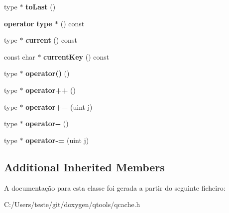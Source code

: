 \begin{DoxyCompactItemize}
\item 
\hypertarget{class_q_cache_iterator_ae427337160afaa9645615a818663af55}{type $\ast$ {\bfseries to\-Last} ()}\label{class_q_cache_iterator_ae427337160afaa9645615a818663af55}

\item 
\hypertarget{class_q_cache_iterator_a2e144510e7eb044f9d96660f6590a589}{{\bfseries operator type $\ast$} () const }\label{class_q_cache_iterator_a2e144510e7eb044f9d96660f6590a589}

\item 
\hypertarget{class_q_cache_iterator_ac22b90cda8a81fe45ae121578fcf9726}{type $\ast$ {\bfseries current} () const }\label{class_q_cache_iterator_ac22b90cda8a81fe45ae121578fcf9726}

\item 
\hypertarget{class_q_cache_iterator_a61c51c740822498cafca355946ba7cbb}{const char $\ast$ {\bfseries current\-Key} () const }\label{class_q_cache_iterator_a61c51c740822498cafca355946ba7cbb}

\item 
\hypertarget{class_q_cache_iterator_a53bb20f7dd4f90cc047f999b7dec5fe0}{type $\ast$ {\bfseries operator()} ()}\label{class_q_cache_iterator_a53bb20f7dd4f90cc047f999b7dec5fe0}

\item 
\hypertarget{class_q_cache_iterator_a60e0a5b2a616525ebaec6c235b066c3e}{type $\ast$ {\bfseries operator++} ()}\label{class_q_cache_iterator_a60e0a5b2a616525ebaec6c235b066c3e}

\item 
\hypertarget{class_q_cache_iterator_a689beef631dff5b294c16f1246e6c230}{type $\ast$ {\bfseries operator+=} (uint j)}\label{class_q_cache_iterator_a689beef631dff5b294c16f1246e6c230}

\item 
\hypertarget{class_q_cache_iterator_a27b7f0088525ef58cf50fd09f9fdda1e}{type $\ast$ {\bfseries operator-\/-\/} ()}\label{class_q_cache_iterator_a27b7f0088525ef58cf50fd09f9fdda1e}

\item 
\hypertarget{class_q_cache_iterator_a2b73339c97d5e4813c6919bfb3b1f8d1}{type $\ast$ {\bfseries operator-\/=} (uint j)}\label{class_q_cache_iterator_a2b73339c97d5e4813c6919bfb3b1f8d1}

\end{DoxyCompactItemize}
\subsection*{Additional Inherited Members}


A documentação para esta classe foi gerada a partir do seguinte ficheiro\-:\begin{DoxyCompactItemize}
\item 
C\-:/\-Users/teste/git/doxygen/qtools/qcache.\-h\end{DoxyCompactItemize}
